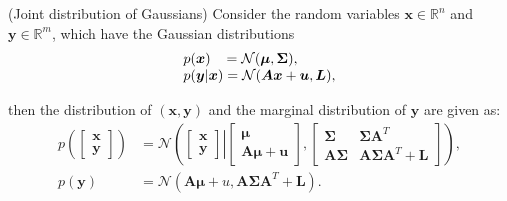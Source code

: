 \documentclass[a4paper,11pt]{book}
\numberwithin{figure}{chapter}
\numberwithin{equation}{chapter}
\numberwithin{table}{chapter}
\newtheorem{lemma}[theorem]{Lemma}
\theoremstyle{definition}
\newcounter{boxed-theorem}
\newcounter{boxed-lemma}
\newenvironment{boxed-lemma}[1]
{\colorlet{shadecolor}{pastelPurple!10} \begin{shaded} \begin{lemma}{#1}}
{\end{lemma} \end{shaded}}
\newcounter{boxed-definition}
\newcounter{boxed-example}
\begin{document}
\begin{boxed-lemma}{(Joint distribution of Gaussians)} \label{le:jointGauss}
	Consider the random variables $\bm{x} \in \mathbb{R}^n$ and $\bm{y} \in \mathbb{R}^m$, which have the Gaussian distributions
	\begin{equation}
		\begin{matrix*}[l]
			p(\bm{x})\phantom{|x} = \mathcal{N}(\bm{\mu}, \bm{\Sigma}), \hfill \\
			p(\bm{y}|\bm{x}) = \mathcal{N}(\bm{A} \bm{x} + \bm{u}, \bm{L}),
		\end{matrix*}
	\end{equation}
	
	\noindent then the distribution of $(\bm{x}, \bm{y})$ and the marginal distribution of $\bm{y}$ are given as:
	\begin{equation}
	\begin{split}
		p\left( \begin{bmatrix} \bm{x} \\ \bm{y} \end{bmatrix} \right) &= \mathcal{N}\left( \left. \begin{bmatrix} \bm{x} \\ \bm{y} \end{bmatrix} \right| \begin{bmatrix} \bm{\mu} \\ \bm{A} \bm{\mu} + \bm{u} \end{bmatrix}, \begin{bmatrix} \bm{\Sigma} & \bm{\Sigma} \bm{A}^T \\ \bm{A} \bm{\Sigma} & \bm{A} \bm{\Sigma} \bm{A}^T + \bm{L} \end{bmatrix} \right), \\
		p(\bm{y})  &= \mathcal{N} \left( \bm{A} \bm{\mu} + u, \bm{A} \bm{\Sigma} \bm{A}^T + \bm{L} \right).
	\end{split}			
	\end{equation}
\end{boxed-lemma}
\end{document}
